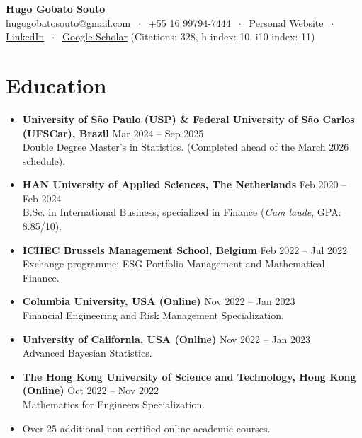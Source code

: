 \documentclass[10pt,a4paper]{article}
\newcommand{\cvitem}[2]{\textbf{#1} \hfill {\small\color{muted}#2}\\}
\begin{document}
\begin{center}
    {\LARGE\bfseries Hugo Gobato Souto}\\[4pt]
    {\small
        \href{mailto:hugogobatosouto@gmail.com}{hugogobatosouto@gmail.com} $\;\cdot\;$
        +55 16 99794-7444 $\;\cdot\;$
        \href{https://hugogobatosouto.github.io/}{Personal Website} $\;\cdot\;$
        \href{https://www.linkedin.com/in/hugo-gobato-souto/}{LinkedIn} $\;\cdot\;$
        \href{https://scholar.google.com/citations?user=YOUR_ID}{Google Scholar} (Citations: 328, h-index: 10, i10-index: 11)
    }
\end{center}

\section{Education}
\begin{itemize}
    \item \cvitem{University of S\~ao Paulo (USP) \& Federal University of S\~ao Carlos (UFSCar), Brazil}{Mar 2024 -- Sep 2025}
    Double Degree Master's in Statistics. (Completed ahead of the March 2026 schedule).
    \item \cvitem{HAN University of Applied Sciences, The Netherlands}{Feb 2020 -- Feb 2024}
    B.Sc. in International Business, specialized in Finance (\textit{Cum laude}, GPA: 8.85/10).
    \item \cvitem{ICHEC Brussels Management School, Belgium}{Feb 2022 -- Jul 2022}
    Exchange programme: ESG Portfolio Management and Mathematical Finance.
    \ifshortcv\else
    \item \cvitem{Columbia University, USA (Online)}{Nov 2022 -- Jan 2023}
    Financial Engineering and Risk Management Specialization.
    \item \cvitem{University of California, USA (Online)}{Nov 2022 -- Jan 2023}
    Advanced Bayesian Statistics.
    \item \cvitem{The Hong Kong University of Science and Technology, Hong Kong (Online)}{Oct 2022 -- Nov 2022}
    Mathematics for Engineers Specialization.
    \item Over 25 additional non-certified online academic courses.
    \fi
\end{itemize}

\end{document}
